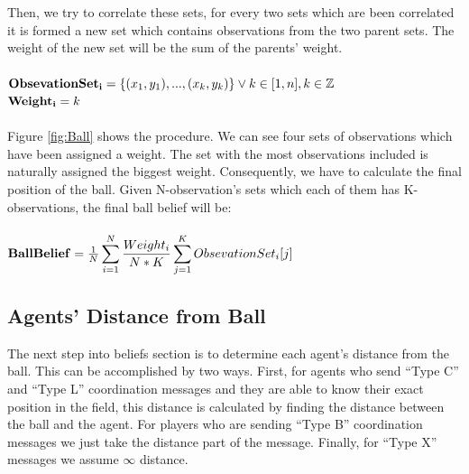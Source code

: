 Then, we try to correlate these sets, for every two sets which are been correlated it is formed a new set which contains observations from the two parent sets. The weight of the new set will be the sum of the parents' weight.\\
\\
${\bf Obsevation Set_{i} } = \lbrace (x_{1},y_{1}),...,(x_{k},y_{k}) \rbrace \vee k \in [1,n] , k\in \mathbb{Z}$\\
${\bf Weight_{i}} = k$\\
\\
Figure \ref{fig:Ball} shows the procedure. We can see four sets of observations which have been assigned a weight. The set with the most observations included is naturally assigned the biggest weight. Consequently, we have to calculate the final position of the ball.
Given N-observation's sets which each of them has K-observations, the final ball belief will be:\\
\\
${\bf Ball Belief} = \frac {1} {N} \displaystyle\sum\limits_{i=1}^N \frac {Weight_{i}} {N \ast K}  \displaystyle\sum\limits_{j=1}^K Obsevation Set_{i}[j]$
\subsection{Agents' Distance from Ball}
The next step into beliefs section is to determine each agent's distance from the ball. This can be accomplished by two ways. First, for agents who send ``Type C'' and ``Type L'' coordination messages and they are able to know their exact position in the field, this distance is calculated by finding the distance between the ball and the agent. For players who are sending ``Type B'' coordination messages we just take the distance part of the message. Finally, for ``Type X'' messages we assume $\infty$ distance.

